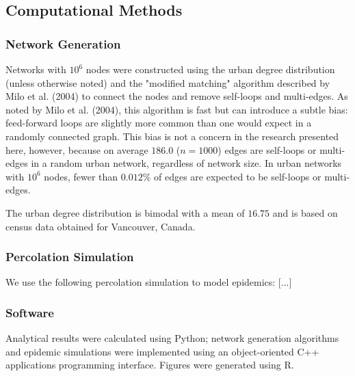 \documentclass[11pt, a4paper]{article}
\begin{document}
\subsection{Computational Methods}

\subsubsection{Network Generation}
Networks with $10^{6}$ nodes were constructed using the urban degree distribution (unless otherwise noted) and the "modified matching" algorithm described by Milo et al. (2004) to connect the nodes and remove self-loops and multi-edges.  As noted by Milo et al. (2004), this algorithm is fast but can introduce a subtle bias: feed-forward loops are slightly more common than one would expect in a randomly connected graph.  This bias is not a concern in the research presented here, however, because on average $186.0$ ($n=1000$) edges are self-loops or multi-edges in a random urban network, regardless of network size.  In urban networks with $10^{6}$ nodes, fewer than $0.012 \% $ of edges are expected to be self-loops or multi-edges.

The urban degree distribution is bimodal with a mean of $16.75$ and is based on census data obtained for Vancouver, Canada.

\subsubsection{Percolation Simulation}
We use the following percolation simulation to model epidemics: [...]

\subsubsection{Software}
Analytical results were calculated using Python; network generation algorithms and epidemic simulations were implemented using an object-oriented C++ applications programming interface. Figures were generated using R.
\end{document}
